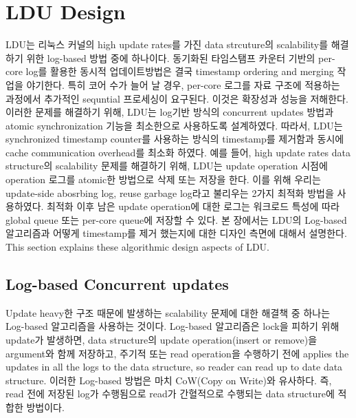 \section{LDU Design}


\ifkor
LDU는 리눅스 커널의 high update rates를 가진 data strcuture의 scalability를
해결하기 위한 log-based 방법 중에 하나이다.
동기화된 타임스탬프 카운터 기반의 per-core log를 활용한 동시적 업데이트방법은 결국 timestamp ordering and
merging 작업을 야기한다.
특히 코어 수가 늘어 날 경우, per-core 로그를 자료 구조에 적용하는 과정에서 추가적인 sequntial 프로세싱이 요구된다.
이것은 확장성과 성능을 저해한다. 
이러한 문제를 해결하기 위해, LDU는 log기반 방식의 concurrent updates 방법과 atomic synchronization
기능을 최소한으로 사용하도록 설계하였다.
따라서, LDU는 synchronized timestamp counter를 사용하는 방식의 timestamp를 제거함과 동시에 cache
communication overhead를 최소화 하였다.
예를 들어, high update rates data structure의 scalability 문제를 해결하기 위해, LDU는 update
operation 시점에 operation 로그를 atomic한 방법으로 삭제 또는 저장을 한다.
이를 위해 우리는 update-side abosrbing log, reuse garbage log라고 불리우는 2가지 최적화 방법을
사용하였다.
최적화 이후 남은 update operation에 대한 로그는 워크로드 특성에 따라 global queue 또는 per-core queue에
저장할 수 있다.
본 장에서는 LDU의 Log-based 알고리즘과 어떻게 timestamp를 제거 했는지에 대한 디자인 측면에 대해서
설명한다.
\else
This section explains these algorithmic design aspects of LDU.
\fi



\subsection{Log-based Concurrent updates}


\ifkor
Update heavy한 구조 때문에 발생하는 scalability 문제에 대한 해결책 중 하나는 Log-based 알고리즘을 사용하는 것이다.
Log-based 알고리즘은 lock을 피하기 위해 update가 발생하면, data structure의 update
operation(insert or remove)을 argument와 함께 저장하고, 주기적 또는 read operation을 수행하기 전에
applies the updates in all the logs to the data structure, so reader can read up to date data structure.
이러한 Log-based 방법은 마치 CoW(Copy on Write)와 유사하다.
즉, read 전에 저장된 log가 수행됨으로 read가 간혈적으로 수행되는 data structure에 적합한 방법이다.
\else

